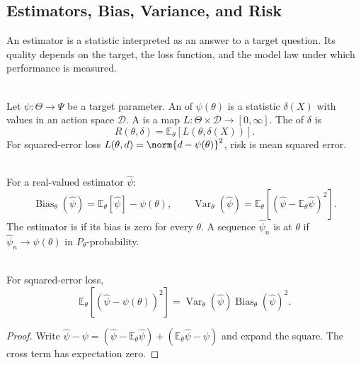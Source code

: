 \subsection{Estimators, Bias, Variance, and Risk}

An estimator is a statistic interpreted as an answer to a target question.  Its quality depends on the target, the loss function, and the model law under which performance is measured.

\begin{definition} \label{def:estimator-loss-risk} \\
Let $\psi:\Theta\to\Psi$ be a target parameter.  An  of $\psi(\theta)$ is a statistic $\delta(X)$ with values in an action space $\mathcal{D}$.  A  is a map $L:\Theta\times\mathcal{D}\to[0,\infty]$.  The  of $\delta$ is
\[
R(\theta,\delta)=\mathbb{E}_\theta[L(\theta,\delta(X))].
\]
For squared-error loss $L(\theta,d)=\norm{d-\psi(\theta)}^2$, risk is mean squared error.
\end{definition}

\begin{definition} \label{def:bias-variance-consistency} \\
For a real-valued estimator $\widehat{\psi}$:
\[
\operatorname{Bias}_\theta(\widehat{\psi})
=\mathbb{E}_\theta[\widehat{\psi}]-\psi(\theta),
\qquad
\operatorname{Var}_\theta(\widehat{\psi})
=\mathbb{E}_\theta[(\widehat{\psi}-\mathbb{E}_\theta\widehat{\psi})^2].
\]
The estimator is  if its bias is zero for every $\theta$.  A sequence $\widehat{\psi}_n$ is  at $\theta$ if $\widehat{\psi}_n\to\psi(\theta)$ in $P_\theta$-probability.
\end{definition}

\begin{proposition} \label{prop:mse-bias-variance-decomposition} \\
For squared-error loss,
\[
\mathbb{E}_\theta[(\widehat{\psi}-\psi(\theta))^2]
=\operatorname{Var}_\theta(\widehat{\psi})
\operatorname{Bias}_\theta(\widehat{\psi})^2.
\]
\begin{proof}
Write $\widehat{\psi}-\psi=(\widehat{\psi}-\mathbb{E}_\theta\widehat{\psi})+(\mathbb{E}_\theta\widehat{\psi}-\psi)$ and expand the square.  The cross term has expectation zero.
\end{proof}
\end{proposition}

